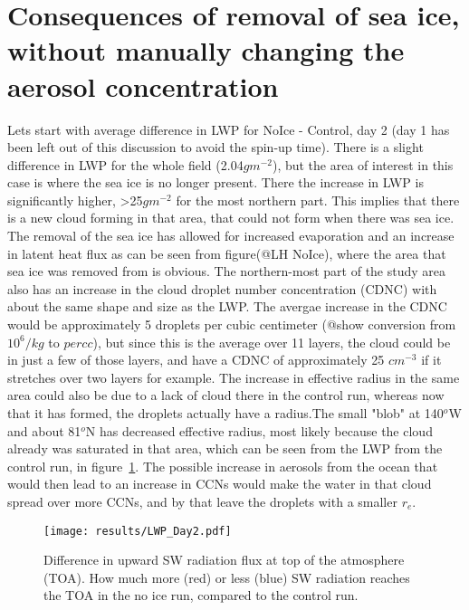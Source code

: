 \section{Consequences of removal of sea ice, without manually changing the aerosol concentration}
Lets start with average difference in LWP for NoIce - Control, day 2 (day 1 has been left out of this discussion to avoid the spin-up time).%
 There is a slight difference in LWP for the whole field (2.04$gm^{-2}$), but the area of interest in this case is where the sea ice is no longer present. There the increase in LWP is significantly higher, >25$gm^{-2}$ for the most northern part. This implies that there is a new cloud forming in that area, that could not form when there was sea ice. The removal of the sea ice has allowed for increased evaporation and an increase in latent heat flux as can be seen from figure(@LH NoIce), where the area that sea ice was removed from is obvious. The northern-most part of the study area also has an increase in the cloud droplet number concentration (CDNC) with about the same shape and size as the LWP. The avergae increase in the CDNC would be approximately 5 droplets per cubic centimeter (@show conversion from $10^6/kg$ to $per cc$), but since this is the average over 11 layers, the cloud could be in just a few of those layers, and have a CDNC of approximately 25 $cm^{-3}$ if it stretches over two layers for example. The increase in effective radius in the same area could also be due to a lack of cloud there in the control run, whereas now that it has formed, the droplets actually have a radius.The small "blob" at 140$^o$W and about 81$^o$N has decreased effective radius, most likely because the cloud already was saturated in that area, which can be seen from the LWP from the control run, in figure~\ref{fig:LWPr1Day2}. The possible increase in aerosols from the ocean that would then lead to an increase in CCNs would make the water in that cloud spread over more CCNs, and by that leave the droplets with a smaller $r_e$.

\begin{figure}
\centering
\texttt{[image: results/LWP\_Day2.pdf]}
\caption{Difference in upward SW radiation flux at top of the atmosphere (TOA). How much more (red) or less (blue) SW radiation reaches the TOA in the no ice run, compared to the control run.}
\label{fig:LWPr1Day2}
\end{figure}

